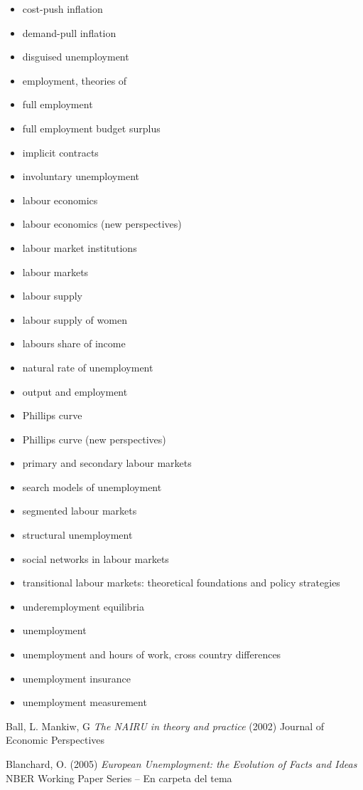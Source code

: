 \documentclass{nuevotema}
\begin{document}
\begin{itemize}
	\item cost-push inflation
	\item demand-pull inflation
	\item disguised unemployment
	\item employment, theories of
	\item full employment
	\item full employment budget surplus
	\item implicit contracts
	\item involuntary unemployment
	\item labour economics
	\item labour economics (new perspectives)
	\item labour market institutions
	\item labour markets
	\item labour supply
	\item labour supply of women
	\item labours share of income
	\item natural rate of unemployment
	\item output and employment
	\item Phillips curve
	\item Phillips curve (new perspectives)
	\item primary and secondary labour markets
	\item search models of unemployment
	\item segmented labour markets
	\item structural unemployment
	\item social networks in labour markets
	\item transitional labour markets: theoretical foundations and policy strategies
	\item underemployment equilibria
	\item unemployment
	\item unemployment and hours of work, cross country differences
	\item unemployment insurance
	\item unemployment measurement
\end{itemize}

Ball, L. Mankiw, G \textit{The NAIRU in theory and practice} (2002) Journal of Economic Perspectives

Blanchard, O. (2005) \textit{European Unemployment: the Evolution of Facts and Ideas} NBER Working Paper Series -- En carpeta del tema
\end{document}
